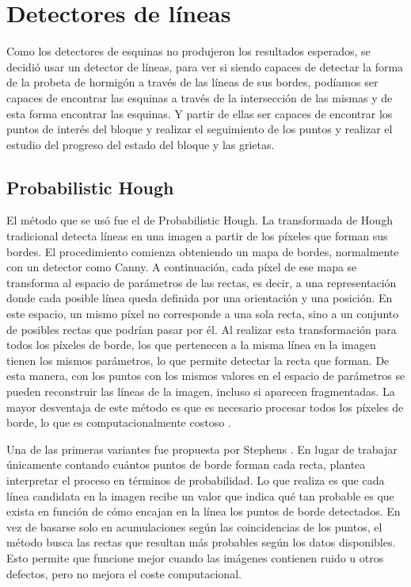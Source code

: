 \section{Detectores de líneas}
Como los detectores de esquinas no produjeron los resultados esperados, se decidió usar un detector de líneas, para ver si siendo capaces de detectar la forma de la probeta de hormigón a través de las líneas de sus bordes, podíamos ser capaces de encontrar las esquinas a través de la intersección de las mismas y de esta forma encontrar las esquinas. Y partir de ellas ser capaces de encontrar los puntos de interés del bloque y realizar el seguimiento de los puntos y realizar el estudio del progreso del estado del bloque y las grietas.

\subsection{Probabilistic Hough}
El método que se usó fue el de Probabilistic Hough. La transformada de Hough tradicional detecta líneas en una imagen a partir de los píxeles que forman sus bordes. El procedimiento comienza obteniendo un mapa de bordes, normalmente con un detector como Canny. A continuación, cada píxel de ese mapa se transforma al espacio de parámetros de las rectas, es decir, a una representación donde cada posible línea queda definida por una orientación y una posición. En este espacio, un mismo píxel no corresponde a una sola recta, sino a un conjunto de posibles rectas que podrían pasar por él. Al realizar esta transformación para todos los píxeles de borde, los que pertenecen a la misma línea en la imagen tienen los mismos parámetros, lo que permite detectar la recta que forman. De esta manera, con los puntos con los mismos valores en el espacio de parámetros se pueden reconstruir las líneas de la imagen, incluso si aparecen fragmentadas. La mayor desventaja de este método es que es necesario procesar todos los píxeles de borde, lo que es computacionalmente costoso \cite{duda1972hough}.

Una de las primeras variantes fue propuesta por Stephens \cite{stephens1991pht}. En lugar de trabajar únicamente contando cuántos puntos de borde forman cada recta, plantea interpretar el proceso en términos de probabilidad. Lo que realiza es que cada línea candidata en la imagen recibe un valor que indica qué tan probable es que exista en función de cómo encajan en la línea los puntos de borde detectados. En vez de basarse solo en acumulaciones según las coincidencias de los puntos, el método busca las rectas que resultan más probables según los datos disponibles. Esto permite que funcione mejor cuando las imágenes contienen ruido u otros defectos, pero no mejora el coste computacional.

